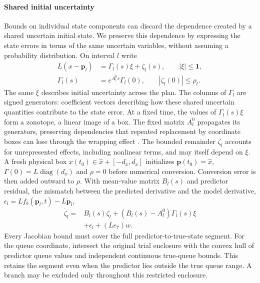 \documentclass[preprint,12pt]{elsarticle}
\theoremstyle{definition}
\theoremstyle{plain}
\theoremstyle{definition}
\theoremstyle{plain}
\begin{document}
\paragraph{Shared initial uncertainty}
Bounds on individual state components can discard the dependence created
by a shared uncertain initial state. We preserve this dependence by
expressing the state errors in terms of the same uncertain variables,
without assuming a probability distribution. On interval $l$ write
\begin{equation}
 \begin{aligned}
 L(x-\mathbf{p}_l)&=\Gamma_l(s)\xi+\zeta_l(s),\qquad |\xi|\le\mathbf1,\\
 \Gamma_l(s)&=e^{A_l^0s}\Gamma_l(0),\qquad |\zeta_l(0)|\le\rho_l.
 \end{aligned}
 \label{eq:structure-affine-set}
\end{equation}
The same $\xi$ describes initial uncertainty across the plan. The columns
of $\Gamma_l$ are signed generators: coefficient vectors describing how
these shared uncertain quantities contribute to the state error. At a
fixed time, the values of $\Gamma_l(s)\xi$ form a zonotope, a linear image
of a box. The fixed matrix $A_l^0$ propagates its generators,
preserving dependencies that repeated replacement by coordinate boxes
can lose through the wrapping effect \cite{kochdumper2021sparse}. The bounded remainder $\zeta_l$
accounts for unrepresented effects, including nonlinear terms, and may
itself depend on $\xi$. A fresh physical box
$x(t_0)\in\widehat x+[-d_x,d_x]$ initializes
$\mathbf{p}(t_0)=\widehat x$, $\Gamma(0)=L\operatorname{diag}(d_x)$ and $\rho=0$
before numerical conversion. Conversion error is then added outward to $\rho$.
With mean-value matrix $B_l(s)$ and predictor residual, the mismatch
between the predicted derivative and the model derivative,
$\epsilon_l=Lf_b(\mathbf{p}_l,t)-L\dot{\mathbf{p}}_l$,
\begin{equation}
 \begin{aligned}
 \dot\zeta_l={}&B_l(s)\zeta_l+(B_l(s)-A_l^0)\Gamma_l(s)\xi\\
              &+\epsilon_l+(Le_7)w.
 \end{aligned}
 \label{eq:structure-remainder-identity}
\end{equation}
Every Jacobian bound must cover the full predictor-to-true-state segment.
For the queue coordinate, intersect the original trial enclosure with the
convex hull of predictor queue values and independent continuous true-queue
bounds. This retains the segment even when the predictor lies outside the
true queue range. A branch may be excluded only throughout this restricted
enclosure.
\end{document}
